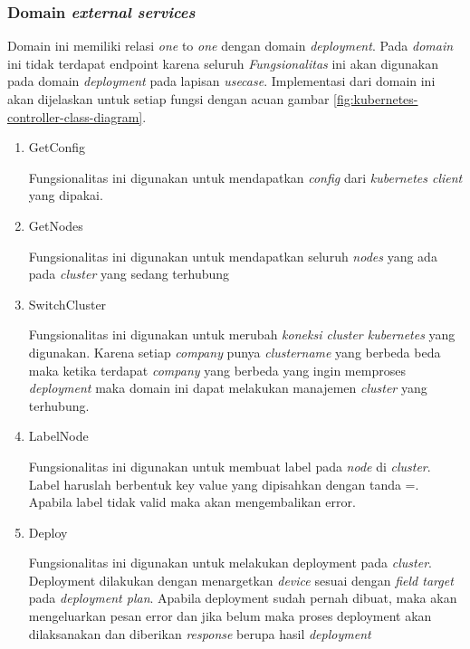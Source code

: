 \subsubsection{Domain \textit{external services}}

Domain ini memiliki relasi \textit{one} to \textit{one} dengan domain \textit{deployment}. Pada \textit{domain} ini tidak terdapat endpoint karena seluruh \textit{Fungsionalitas} ini akan digunakan pada domain \textit{deployment} pada lapisan \textit{usecase}. Implementasi dari domain ini akan dijelaskan untuk setiap fungsi dengan acuan gambar \ref{fig:kubernetes-controller-class-diagram}.


\begin{enumerate}
  \item GetConfig

        Fungsionalitas ini digunakan untuk mendapatkan \textit{config} dari \textit{kubernetes client} yang dipakai.

  \item GetNodes

        Fungsionalitas ini digunakan untuk mendapatkan seluruh \textit{nodes} yang ada pada \textit{cluster} yang sedang terhubung

  \item SwitchCluster

        Fungsionalitas ini digunakan untuk merubah \textit{koneksi cluster kubernetes} yang digunakan. Karena setiap \textit{company} punya \textit{cluster\textunderscore name} yang berbeda beda maka ketika terdapat \textit{company} yang berbeda yang ingin memproses \textit{deployment} maka domain ini dapat melakukan manajemen \textit{cluster} yang terhubung.

  \item LabelNode

        Fungsionalitas ini digunakan untuk membuat label pada \textit{node} di \textit{cluster}. Label haruslah berbentuk key value yang dipisahkan dengan tanda =. Apabila label tidak valid maka akan mengembalikan error.

  \item Deploy

        Fungsionalitas ini digunakan untuk melakukan deployment pada \textit{cluster}. Deployment dilakukan dengan menargetkan \textit{device} sesuai dengan \textit{field target} pada \textit{deployment plan}. Apabila deployment sudah pernah dibuat, maka akan mengeluarkan pesan error dan jika belum maka proses deployment akan dilaksanakan dan diberikan \textit{response} berupa hasil \textit{deployment}


\end{enumerate}

